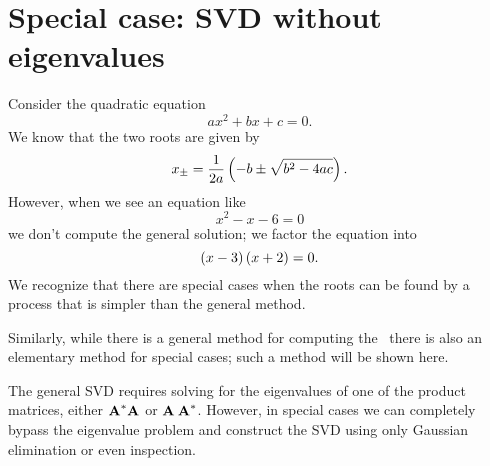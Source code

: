\chapter[SVD without eigenvalues]{Special case: SVD without eigenvalues}
\label{chap:simple}
Consider the quadratic equation
\begin{equation}
  ax^{2}+bx+c = 0.
\end{equation}
We know that the two roots are given by
\begin{equation}
  x_{\pm} = \frac{1}{2a}\left( -b\pm\sqrt{b^{2}-4ac} \right).
\end{equation}
However, when we see an equation like
\begin{equation}
  x^{2}-x-6 = 0
\end{equation}
we don't compute the general solution; we factor the equation into
\begin{equation}
  \left( x-3 \right)\left( x+2 \right) = 0.
\end{equation}
We recognize that there are special cases when the roots can be found by a process that is simpler than the general method.

Similarly, while there is a general method for computing the \svdp \ there is also an elementary method for special cases; such a method will be shown here.

The general SVD requires solving for the eigenvalues of one of the product matrices, either $\textbf{A}^{\mathrm{ \mathrm{*} }}\textbf{A}^{\mathrm{}}$ or $\textbf{A}^{\mathrm{}}\,\textbf{A}^{\mathrm{ \mathrm{*} }}$. However, in special cases we can completely bypass the eigenvalue problem and construct the SVD using only Gaussian elimination or even inspection.







\endinput